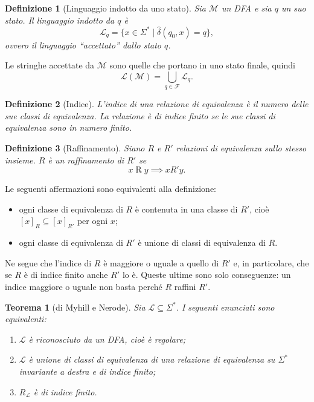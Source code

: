 \documentclass[a4paper, 11pt, oneside]{book}
\theoremstyle{formale}
\newtheorem{theorem}{Teorema}
\newtheorem*{definition}{Definizione}
\begin{document}
    \begin{definition}[Linguaggio indotto da uno stato]
        Sia $\mathcal{M}$ un DFA e sia $q$ un suo stato. Il linguaggio \emph{indotto}
        da $q$ \`e
        \begin{equation*}
            \mathcal{L}_q = \{x \in \Sigma^* \mid \hat{\delta}(q_0, x) = q\},
        \end{equation*}
        ovvero il linguaggio ``accettato'' dallo stato $q$.
    \end{definition}
    Le stringhe accettate da $\mathcal{M}$ sono quelle che portano in uno stato finale,
    quindi
    \begin{equation*}
        \mathcal{L}(\mathcal{M}) = \bigcup_{q \in \mathcal{F}} \mathcal{L}_q.
    \end{equation*}

    \begin{definition}[Indice]
        L'\emph{indice} di una relazione di equivalenza \`e il numero delle sue classi di
        equivalenza. La relazione \`e \emph{di indice finito} se le sue classi di
        equivalenza sono in numero finito.
    \end{definition}

    \begin{definition}[Raffinamento]
        Siano $R$ e $R'$ relazioni di equivalenza sullo stesso insieme. $R$ \`e un
        \emph{raffinamento} di $R'$ se
        \begin{equation*}
            x \mathrel{R} y \implies x \mathrel{R'} y.
        \end{equation*}
    \end{definition}
    Le seguenti affermazioni sono equivalenti alla definizione:
    \begin{itemize}
        \item ogni classe di equivalenza di $R$ \`e contenuta in una classe di $R'$, cio\`e
            $[x]_R \subseteq [x]_{R'}$ per ogni $x$;
        \item ogni classe di equivalenza di $R'$ \`e unione di classi di equivalenza
            di $R$.
    \end{itemize}
    Ne segue che l'indice di $R$ \`e maggiore o uguale a quello di $R'$ e, in
    particolare, che se $R$ \`e di indice finito anche $R'$ lo \`e. Queste ultime sono
    solo conseguenze: un indice maggiore o uguale non basta perch\'e $R$ raffini $R'$.

    \begin{theorem}[di Myhill e Nerode]
        \label{thm:myhill-nerode}
        Sia $\mathcal{L} \subseteq \Sigma^*$. I seguenti enunciati sono equivalenti:
        \begin{enumerate}[label=\textup{(\arabic*)}]
            \item $\mathcal{L}$ \`e riconosciuto da un DFA, cio\`e \`e regolare;
            \item $\mathcal{L}$ \`e unione di classi di equivalenza di una relazione di
                equivalenza su $\Sigma^*$ invariante a destra e di indice finito;
            \item $R_{\mathcal{L}}$ \`e di indice finito.
        \end{enumerate}
    \end{theorem}
\end{document}
